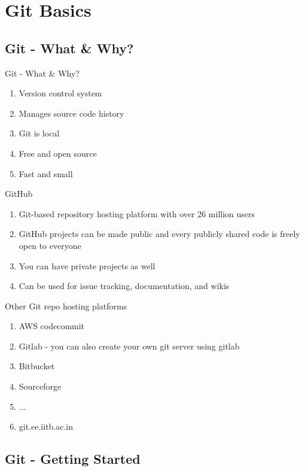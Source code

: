 \documentclass{beamer}
\begin{document}
\section{Git Basics}
{
\subsection{Git - What & Why?}

\begin{frame}{Git - What & Why?}
	\begin{enumerate}
		\item<2-> Version control system
		\item<2-> Manages source code history
		\item<2-> Git is local
		\item<3-> Free and open source
		\item<3-> Fast and small		
	\end{enumerate}
\end{frame}

\begin{frame}{GitHub}
	\begin{enumerate}
		\item<2-> Git-based repository hosting platform with over 26 million users
		\item<3-> GitHub projects can be made public and every publicly shared code is freely open to everyone
		\item<4-> You can have private projects as well
		\item<5-> Can be used for issue tracking, documentation, and wikis
	\end{enumerate}
\end{frame}

\begin{frame}{Other Git repo hosting platforms}
	\begin{enumerate}
		\item AWS codecommit
		\item Gitlab - you can also create your own git server using gitlab
		\item Bitbucket
		\item Sourceforge
		\item ...
		\item git.ee.iitb.ac.in 
	\end{enumerate}
\end{frame}

\subsection{Git - Getting Started}

}
\end{document}
